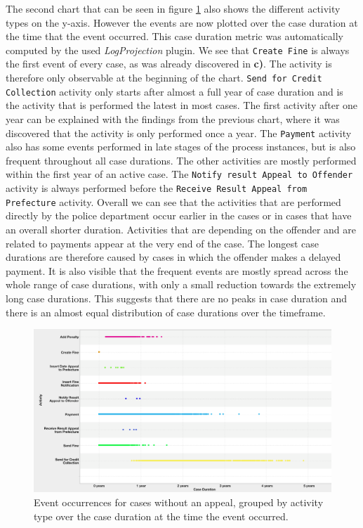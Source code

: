 \documentclass[12pt]{report}
\begin{document}
The second chart that can be seen in figure \ref{fig:dotted_duration} also shows the different activity types on the y-axis. However the events are now plotted over the case duration at the time that the event occurred. This case duration metric was automatically computed by the used \emph{LogProjection} plugin. We see that \texttt{Create Fine} is always the first event of every case, as was already discovered in \textbf{c)}. The activity is therefore only observable at the beginning of the chart. \texttt{Send for Credit Collection} activity only starts after almost a full year of case duration and is the activity that is performed the latest in most cases. The first activity after one year can be explained with the findings from the previous chart, where it was discovered that the activity is only performed once a year. The \texttt{Payment} activity also has some events performed in late stages of the process instances, but is also frequent throughout all case durations. The other activities are mostly performed within the first year of an active case. The \texttt{Notify result Appeal to Offender} activity is always performed before the \texttt{Receive Result Appeal from Prefecture} activity. Overall we can see that the activities that are performed directly by the police department occur earlier in the cases or in cases that have an overall shorter duration. Activities that are depending on the offender and are related to payments appear at the very end of the case. The longest case durations are therefore caused by cases in which the offender makes a delayed payment. It is also visible that the frequent events are mostly spread across the whole range of case durations, with only a small reduction towards the extremely long case durations. This suggests that there are no peaks in case duration and there is an almost equal distribution of case durations over the timeframe.

\begin{figure}[H]
  \centering
  \includegraphics[width=\textwidth]{figures/dotted_duration.png}
  \caption{Event occurrences for cases without an appeal, grouped by activity type over the case duration at the time the event occurred.}
  \label{fig:dotted_duration}
\end{figure}
\end{document}
